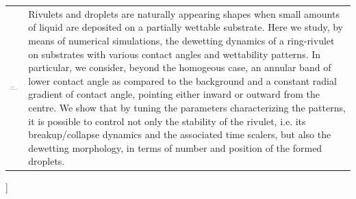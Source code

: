 \documentclass[twoside,twocolumn,9pt]{article}
\begin{document}
\begin{@twocolumnfalse}
\begin{tabular}{m{4.5cm} p{13.5cm} }
\includegraphics{head_foot/dates} & \noindent\normalsize{
\noindent Rivulets and droplets are naturally appearing shapes when small amounts of liquid are deposited on a partially wettable substrate.
Here we study, by means of numerical simulations, the dewetting dynamics of a ring-rivulet on substrates with various contact angles and wettability patterns.
In particular, we consider, beyond the homogeous case, an annular band of lower contact angle as compared to the background and a constant radial gradient of contact angle, pointing either inward or outward from the centre. 
We show that by tuning the parameters characterizing the patterns, it is possible to control 
not only the stability of the rivulet, i.e. its breakup/collapse dynamics and 
the associated time scalers, but also the dewetting morphology, in terms of number and position of the formed droplets.
}

\end{tabular}

 \end{@twocolumnfalse} \vspace{0.6cm}

]

\renewcommand*\rmdefault{bch}\normalfont\upshape
\rmfamily
\section*{}
\vspace{-1cm}



\end{document}
